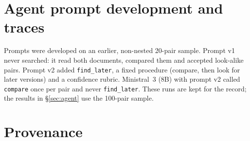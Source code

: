 \documentclass[11pt,a4paper]{article}
\newcommand{\code}[1]{\texttt{\small #1}}
\begin{document}
\clearpage
\section{Agent prompt development and traces}\label{sec:agentruns}
Prompts were developed on an earlier, non-nested 20-pair sample. Prompt v1 never
searched: it read both documents, compared them and accepted look-alike pairs.
Prompt v2 added \code{find\_later}, a fixed procedure (compare, then look for later
versions) and a confidence rubric. Ministral~3 (8B) with prompt v2 called
\code{compare} once per pair and never \code{find\_later}. These runs are kept for
the record; the results in §\ref{sec:agent} use the 100-pair sample.
\begin{center}\small


\medskip
\resizebox{\linewidth}{!}{}
\end{center}


\section{Provenance}
\begin{center}\small
\resizebox{\linewidth}{!}{}
\end{center}
\end{document}
